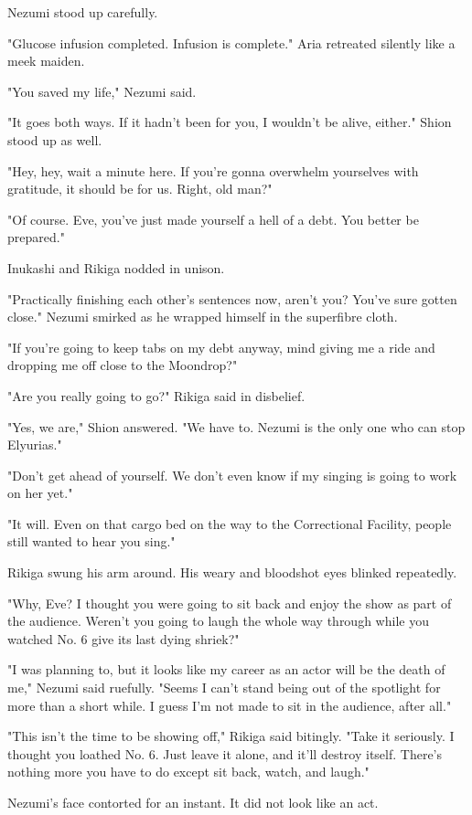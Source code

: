 Nezumi stood up carefully.

"Glucose infusion completed. Infusion is complete." Aria retreated
silently like a meek maiden.

"You saved my life," Nezumi said.

"It goes both ways. If it hadn't been for you, I wouldn't be alive,
either." Shion stood up as well.

"Hey, hey, wait a minute here. If you're gonna overwhelm yourselves with
gratitude, it should be for us. Right, old man?"

"Of course. Eve, you've just made yourself a hell of a debt. You better
be prepared."

Inukashi and Rikiga nodded in unison.

"Practically finishing each other's sentences now, aren't you? You've
sure gotten close." Nezumi smirked as he wrapped himself in the
superfibre cloth.

"If you're going to keep tabs on my debt anyway, mind giving me a ride
and dropping me off close to the Moondrop?"

"Are you really going to go?" Rikiga said in disbelief.

"Yes, we are," Shion answered. "We have to. Nezumi is the only one who
can stop Elyurias."

"Don't get ahead of yourself. We don't even know if my singing is going
to work on her yet."

"It will. Even on that cargo bed on the way to the Correctional
Facility, people still wanted to hear you sing."

Rikiga swung his arm around. His weary and bloodshot eyes blinked
repeatedly.

"Why, Eve? I thought you were going to sit back and enjoy the show as
part of the audience. Weren't you going to laugh the whole way through
while you watched No. 6 give its last dying shriek?"

"I was planning to, but it looks like my career as an actor will be the
death of me," Nezumi said ruefully. "Seems I can't stand being out of
the spotlight for more than a short while. I guess I'm not made to sit
in the audience, after all."

"This isn't the time to be showing off," Rikiga said bitingly. "Take it
seriously. I thought you loathed No. 6. Just leave it alone, and it'll
destroy itself. There's nothing more you have to do except sit back,
watch, and laugh."

Nezumi's face contorted for an instant. It did not look like an act.

